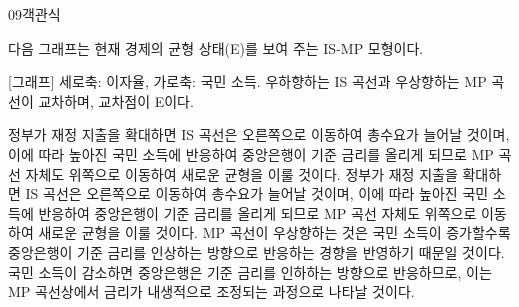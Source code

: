 \documentclass[fs85,seriesWit]{korfarm-base}
\begin{document}
\begin{kfQBlock}{09}{객관식}
\begin{kfEvidence}다음 그래프는 현재 경제의 균형 상태(E)를 보여 주는 IS-MP 모형이다.

[그래프] 세로축: 이자율, 가로축: 국민 소득. 우하향하는 IS 곡선과 우상향하는 MP 곡선이 교차하며, 교차점이 E이다.\end{kfEvidence}
\begin{kfChoices}
\kfChoice 정부가 재정 지출을 확대하면 IS 곡선은 오른쪽으로 이동하여 총수요가 늘어날 것이며, 이에 따라 높아진 국민 소득에 반응하여 중앙은행이 기준 금리를 올리게 되므로 MP 곡선 자체도 위쪽으로 이동하여 새로운 균형을 이룰 것이다.
\kfChoice 정부가 재정 지출을 확대하면 IS 곡선은 오른쪽으로 이동하여 총수요가 늘어날 것이며, 이에 따라 높아진 국민 소득에 반응하여 중앙은행이 기준 금리를 올리게 되므로 MP 곡선 자체도 위쪽으로 이동하여 새로운 균형을 이룰 것이다.
\kfChoice MP 곡선이 우상향하는 것은 국민 소득이 증가할수록 중앙은행이 기준 금리를 인상하는 방향으로 반응하는 경향을 반영하기 때문일 것이다.
\kfChoice 국민 소득이 감소하면 중앙은행은 기준 금리를 인하하는 방향으로 반응하므로, 이는 MP 곡선상에서 금리가 내생적으로 조정되는 과정으로 나타날 것이다.
\end{kfChoices}
\end{kfQBlock}
\end{document}
